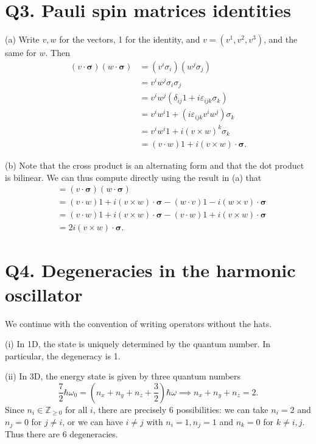 \documentclass[11pt, letterpaper]{article}
\begin{document}
\section{Q3. Pauli spin matrices identities}

(a) Write $v,w$ for the vectors, 1 for the identity, and $v=(v^1,v^2,v^3)$, and the same for $w$. Then
\begin{align*}
	\left( v\cdot \boldsymbol{\sigma}  \right) \left( w\cdot \boldsymbol{\sigma}  \right) &=(v^i\sigma _i)(w^j\sigma _j)\\
											      &=v^iw^j\sigma _i\sigma_j\\
											      &=v^iw^j\left( \delta_{ij}1 +i\varepsilon _{ijk} \sigma _k \right) \\
											      &=v^iw^i1 + (i\varepsilon _{ijk} v^iw^j)\sigma _k\\
											      &=v^iw^i1+ i(v\times w)^k\sigma _k\\
											      &=(v\cdot w)1 +i(v\times w)\cdot \boldsymbol{\sigma} 
.\end{align*}

(b) Note that the cross product is an alternating form and that the dot product is bilinear. We can thus compute directly using the result in (a) that
\begin{align*}
	[v\cdot \boldsymbol{\sigma} ,w\cdot \boldsymbol{\sigma} ]&=\left( v\cdot \boldsymbol{\sigma}  \right) \left( w\cdot \boldsymbol{\sigma}  \right) \\
								 &=(v\cdot w)1+i(v\times w)\cdot \boldsymbol{\sigma} -(w\cdot v)1-i(w\times v)\cdot \boldsymbol{\sigma} \\
								 &=(v\cdot w)1+i(v\times w)\cdot \boldsymbol{\sigma} -(v\cdot  w)1+i(v\times w)\cdot \boldsymbol{\sigma} \\
								 &=2i(v\times w)\cdot \boldsymbol{\sigma} 
.\end{align*}


\section{Q4. Degeneracies in the harmonic oscillator}

We continue with the convention of writing operators without the hats.

(i) In 1D, the state is uniquely determined by the quantum number. In particular, the degeneracy is 1.

(ii) In 3D, the energy state is given by three quantum numbers
\[
	\frac{7}{2} \hbar \omega _0=\left( n_x+n_y+n_z+\frac{3}{2}  \right) \hbar \omega \implies n_x+n_y+n_z=2
.\]
Since $n_i\in\mathbb{Z} _{\geq 0} $ for all $i$, there are precisely 6 possibilities: we can take $n_i=2$ and $n_j=0$ for $j\neq i$, or we can have $i\neq j$ with $n_i=1,n_j=1$ and $n_k = 0$ for $k\neq i,j$. Thus there are 6 degeneracies.
\end{document}
